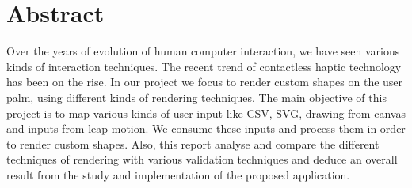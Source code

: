 %
\chapter*{Abstract}
\label{sec:abstract}
\vspace*{-10mm}
Over the years of evolution of human computer interaction, we have seen various kinds of interaction techniques. The recent trend of contactless haptic technology has been on the rise. In our project we focus to render custom shapes on the user palm, using different kinds of rendering techniques. The main objective of this project is to map various kinds of user input like CSV, SVG, drawing from canvas and inputs from leap motion. We consume these inputs and process them in order to render custom shapes. Also, this report analyse and compare the different techniques of rendering with various validation techniques and deduce an overall result from the study and implementation of the proposed application.   



